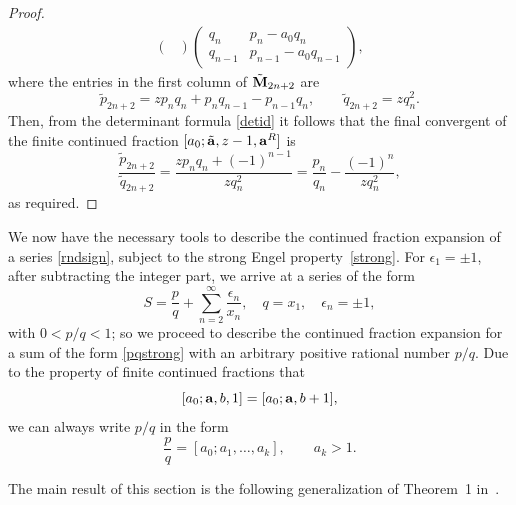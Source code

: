 \documentclass[12pt,a4paper]{amsart}
\theoremstyle{definition}
\numberwithin{equation}{section}
\newcommand\eps{{\epsilon}}
\begin{document}
\begin{proof}
\begin{align*}
\begin{pmatrix}
\end{pmatrix} 
\begin{pmatrix} 
q_n & p_{n}-a_0q_{n}\\ 
q_{n-1} & p_{n-1}-a_0q_{n-1}
\end{pmatrix}, 
\end{align*} 
where the entries in the first column of $\tilde{{\bf M}}_{2n+2}$ are 
\[ 
\tilde{p}_{2n+2} = zp_nq_n+p_nq_{n-1}-p_{n-1}q_n, \qquad 
\tilde{q}_{2n+2} = zq_n^2. 
\] 
Then, from the determinant formula \eqref{detid} it follows that the final convergent of the finite continued fraction 
$[a_0; \tilde{{\bf a}}, z-1, {\bf a}^R]$ 
is 
\[ 
\frac{\tilde{p}_{2n+2}}{\tilde{q}_{2n+2}} = \frac{zp_nq_n+(-1)^{n-1}}{zq_n^2} = \frac{p_n}{q_n} - \frac{(-1)^n}{zq_n^2}, 
\] 
as required. 
\end{proof}

We now have the necessary tools to describe the continued fraction expansion of a series 
\eqref{rndsign}, subject to the strong Engel property~\eqref{strong}. For $\eps_1=\pm 1$, after subtracting 
the integer part, we arrive at a series of the form 
\begin{equation}
\label{pqstrong} 
S = \frac{p}{q} +\sum_{n=2}^\infty \frac{\eps_n}{x_n}, \quad q=x_1, \quad \eps_n=\pm 1, 
\end{equation} 
with $0<p/q<1$; so we proceed to describe the continued fraction expansion for a sum 
of the form \eqref{pqstrong} with an arbitrary positive rational number $p/q$. 
Due to the property of finite continued fractions that 
\begin{equation}
\label{propr}
[a_0; {\bf a}, b,1] = [a_0; {\bf a},b+1], 
\end{equation} 
we can always write $p/q$ in the form 
\begin{equation}
\label{pqfrac} 
\frac{p}{q} = [a_0; a_1,\ldots,a_{k}], \qquad a_k>1. 
\end{equation} 

The main result of this section is the following %
generalization of Theorem~1 in~\cite{folded}.
\end{document}
